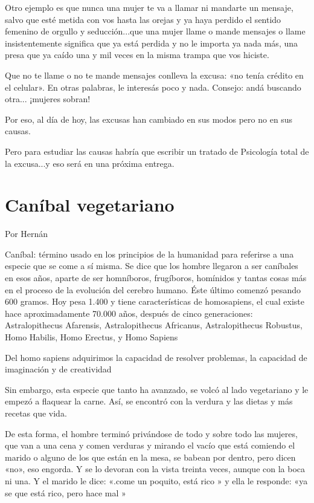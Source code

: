 \documentclass[11pt,twoside,openright,a5paper]{book}
\begin{document}
Otro ejemplo es que nunca una mujer te va a llamar ni mandarte un mensaje, salvo que esté metida con vos hasta las orejas y ya haya perdido el sentido femenino de orgullo y seducción...que una mujer llame o mande mensajes o llame insistentemente significa que ya está perdida y no le importa ya  nada más, una presa que ya caído una y mil veces en la misma trampa que vos hiciste.

Que no te llame o no te mande mensajes conlleva la excusa: «no tenía crédito en el celular». En otras palabras, le interesás poco y nada. Consejo: andá buscando otra... ¡mujeres sobran!

Por eso, al día de hoy, las excusas han cambiado en sus modos pero no en sus causas. 

Pero para estudiar las causas habría que escribir un tratado de Psicología total de la excusa...y eso será en una próxima entrega.

\section*{Caníbal vegetariano}

                                                                                        \begin{flushright}Por Hernán\end{flushright}

Caníbal: término usado en los principios de la humanidad para referirse a una especie que se come a sí misma. Se dice que los hombre llegaron a ser caníbales en esos años, aparte de ser homníboros, frugíboros, homínidos y tantas cosas más en el proceso de la evolución del cerebro humano. Éste último comenzó pesando 600 gramos. Hoy pesa 1.400 y tiene características de homosapiens, el cual existe hace aproximadamente 70.000 años, después de cinco generaciones: Astralopithecus Afarensis,  Astralopithecus Africanus,  Astralopithecus Robustus,  Homo Habilis, Homo Erectus, y Homo Sapiens

Del homo sapiens adquirimos la  capacidad de resolver problemas,  la capacidad  de imaginación y de  creatividad 

Sin embargo, esta especie que tanto ha avanzado, se volcó al lado vegetariano y le empezó a flaquear la carne. Así, se encontró con la verdura y las dietas y más recetas que vida.

De esta forma,  el hombre terminó  privándose de todo  y sobre todo las mujeres, que van a una cena y comen verduras y mirando el vacío que está  comiendo el marido o alguno de los que están en la mesa, se babean por dentro,  pero dicen «no», eso engorda. Y se lo devoran con la vista treinta veces, aunque con la boca ni una. Y el marido le dice: «.come un poquito, está rico » y ella le responde: «ya se que está rico,  pero hace mal » 
\end{document}
